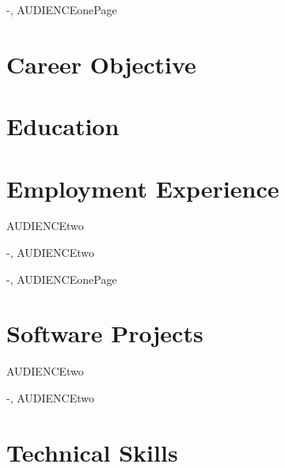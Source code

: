 



\begin{shownto}{-, AUDIENCEonePage}%
	\section*{Career Objective}
	
\end{shownto}

\section*{Education}


\section*{Employment Experience}

\begin{shownto}{AUDIENCEtwo}%
	
\end{shownto}
\begin{shownto}{-, AUDIENCEtwo}%
	
\end{shownto}



\begin{shownto}{-, AUDIENCEonePage}%
	\section*{Software Projects}
	
	\begin{shownto}{AUDIENCEtwo}%
	
	\end{shownto}
	\begin{shownto}{-, AUDIENCEtwo}%
	
	\end{shownto}
\end{shownto}
\section*{Technical Skills}
	
